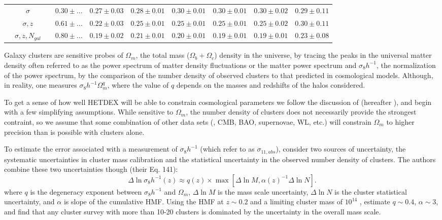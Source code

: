 \documentclass[fleqn,usenatbib]{mnras}
\begin{document}
\begin{table}
\begin{tabular}{cccccccccc}
		&$\sigma$ & \nd & $0.30\pm{...}$ & $0.27\pm{0.03}$ & $0.28\pm{0.01}$ & $0.30\pm{0.01}$ & $0.30\pm{0.01}$ & $0.30\pm{0.02}$ & $0.29\pm{0.11}$ \\
		&$\sigma, z$ & \nd & $0.61\pm{...}$ & $0.22\pm{0.03}$ & $0.25\pm{0.01}$ & $0.25\pm{0.01}$ & $0.25\pm{0.01}$ & $0.25\pm{0.02}$ & $0.30\pm{0.11}$ \\
		&$\sigma, z, N_{gal}$ & \nd & $0.80\pm{...}$ & $0.19\pm{0.02}$ & $0.21\pm{0.01}$ & $0.20\pm{0.01}$ & $0.19\pm{0.01}$ & $0.19\pm{0.01}$ & $0.23\pm{0.08}$ \\
	\hline
	\end{tabular}
\label{tbl:mass scatter}
\end{table}

Galaxy clusters are sensitive probes of $\Omega_m$, the total mass ($\Omega_b + \Omega_c$) density in the universe, by tracing the peaks in the universal matter density often referred to as the power spectrum of matter density fluctuations or the matter power spectrum and $\sigma_8h^{-1}$, the normalization of the power spectrum, by the comparison of the number density of observed clusters to that predicted in cosmological models. Although, in reality, one measures $\sigma_8h^{-1}\Omega_m^q$, where the value of $q$ depends on the masses and redshifts of the halos considered.

To get a sense of how well HETDEX will be able to constrain cosmological parameters we follow the discussion of \cite{Weinberg2013} (hereafter ), and begin with a few simplifying assumptions. While sensitive to $\Omega_m$, the number density of clusters does not necessarily provide the strongest contraint, so we assume that some combination of other data sets (\eg, CMB, BAO, supernovae, WL, etc.) will constrain $\Omega_m$ to higher precision than is possible with clusters alone. 

To estimate the error associated with a measurement of $\sigma_8h^{-1}$ (which  refer to as $\sigma_{11,abs}$),  consider two sources of uncertainty, the systematic uncertainties in cluster mass calibration and the statistical uncertainty in the observed number density of clusters. The authors combine these two uncertainties though (their Eq. 141):
\begin{equation}
\Delta \ln \sigma_8h^{-1}(z) \approx q(z)\times 
        \max\left[ \Delta \ln M, \alpha(z)^{-1} \Delta \ln N \right].
\label{eq:sigElapprox}
\end{equation}
where $q$ is the degeneracy exponent between $\sigma_8h^{-1}$ and $\Omega_m$, $\Delta \ln M$ is the mass scale uncertainty, $\Delta \ln N$ is the cluster statistical uncertainty, and $\alpha$ is slope of the cumulative HMF. Using the \cite{Tinker2008} HMF at $z\sim0.2$ and a limiting cluster mass of $10^{14}$ \Msol,  estimate $q\sim0.4$, $\alpha\sim3$, and find that any cluster survey with more than 10-20 clusters is dominated by the uncertainty in the overall mass scale.
\end{document}

